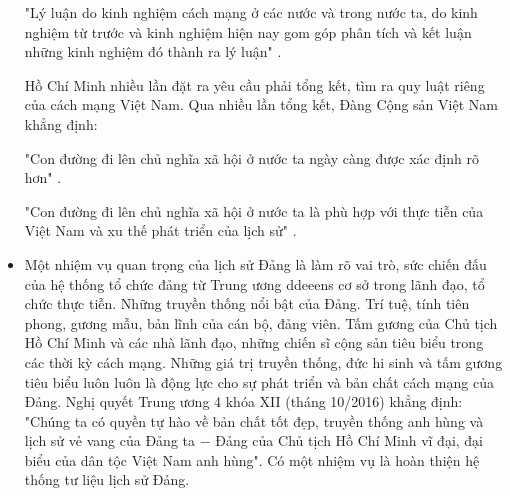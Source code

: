 \begin{itemize}
"Lý luận do kinh nghiệm cách mạng ở các nước và trong nước ta, do kinh nghiệm từ trước và kinh nghiệm hiện nay gom góp phân tích và kết luận những kinh nghiệm đó thành ra lý luận" .

Hồ Chí Minh nhiều lần đặt ra yêu cầu phải tổng kết, tìm ra quy luật riêng của cách mạng Việt Nam. Qua nhiều lần tổng kết, Đàng Cộng sản Việt Nam khẳng định:

"Con đường đi lên chủ nghĩa xã hội ở nước ta ngày càng được xác định rõ hơn" .

"Con đường đi lên chủ nghĩa xã hội ở nước ta là phù hợp với thực tiễn của Việt Nam và xu thế phát triển của lịch sử" .
\item Một nhiệm vụ quan trọng của lịch sử Đảng là làm rõ vai trò, sức chiến đấu của hệ thống tổ chức đảng từ Trung ương ddeeens cơ sở trong lãnh đạo, tổ chức thực tiễn. Những truyền thống nổi bật của Đảng. Trí tuệ, tính tiên phong, gương mẫu, bản lĩnh của cán bộ, đảng viên. Tấm gương của Chủ tịch Hồ Chí Minh và các nhà lãnh đạo, những chiến sĩ cộng sản tiêu biểu trong các thời kỳ cách mạng. Những giá trị truyền thống, đức hi sinh và tấm gương tiêu biểu luôn luôn là động lực cho sự phát triển và bản chất cách mạng của Đảng. Nghị quyết Trung ương 4 khóa XII (tháng 10/2016) khẳng định: "Chúng ta có quyền tự hào về bản chất tốt đẹp, truyền thống anh hùng và lịch sử vẻ vang của Đảng ta $-$ Đảng của Chủ tịch Hồ Chí Minh vĩ đại, đại biểu của dân tộc Việt Nam anh hùng". Có một nhiệm vụ là hoàn thiện hệ thống tư liệu lịch sử Đảng.
\end{itemize}